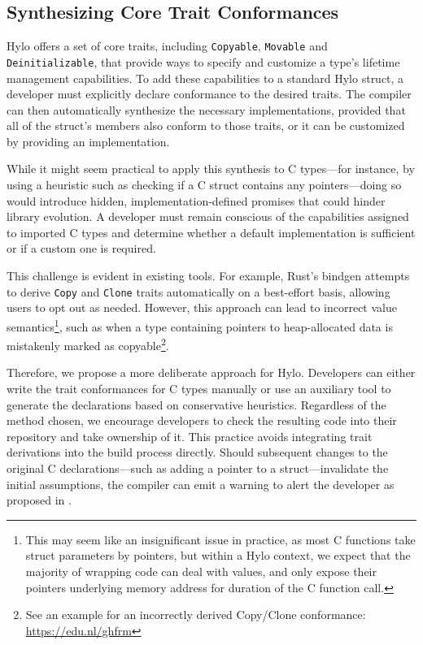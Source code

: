 \subsection{Synthesizing Core Trait Conformances}

Hylo offers a set of core traits, including \texttt{Copyable}, \texttt{Movable} and \texttt{Deinitializable}, that provide ways to specify and customize a type's lifetime management capabilities. To add these capabilities to a standard Hylo struct, a developer must explicitly declare conformance to the desired traits. The compiler can then automatically synthesize the necessary implementations, provided that all of the struct's members also conform to those traits, or it can be customized by providing an implementation.

While it might seem practical to apply this synthesis to C types—for instance, by using a heuristic such as checking if a C struct contains any pointers—doing so would introduce hidden, implementation-defined promises that could hinder library evolution. A developer must remain conscious of the capabilities assigned to imported C types and determine whether a default implementation is sufficient or if a custom one is required.

This challenge is evident in existing tools. For example, Rust's bindgen attempts to derive \texttt{Copy} and \texttt{Clone} traits automatically on a best-effort basis, allowing users to opt out as needed\cite{bindgen-nocopy}. However, this approach can lead to incorrect value semantics\footnote{This may seem like an insignificant issue in practice, as most C functions take struct parameters by pointers, but within a Hylo context, we expect that the majority of wrapping code can deal with values, and only expose their pointers underlying memory address for duration of the C function call.}, such as when a type containing pointers to heap-allocated data is mistakenly marked as copyable\footnote{See an example for an incorrectly derived Copy/Clone conformance: \url{https://edu.nl/ghfrm}}.

Therefore, we propose a more deliberate approach for Hylo. Developers can either write the trait conformances for C types manually or use an auxiliary tool to generate the declarations based on conservative heuristics. Regardless of the method chosen, we encourage developers to check the resulting code into their repository and take ownership of it. This practice avoids integrating trait derivations into the build process directly. Should subsequent changes to the original C declarations—such as adding a pointer to a struct—invalidate the initial assumptions, the compiler can emit a warning to alert the developer as proposed in \cite{hylo-trait-ptr-conformance-warning}.

